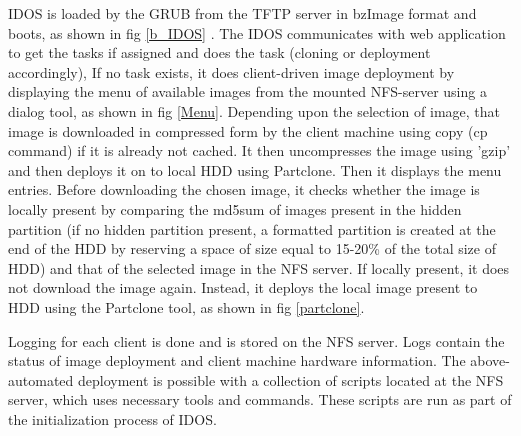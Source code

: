 \documentclass[a4paper,12pt]{article}
\begin{document}
IDOS is loaded by the GRUB from the TFTP server in bzImage format and boots, as shown in fig \ref{b_IDOS} . The IDOS communicates with web application to get the tasks if assigned and does the task (cloning or deployment accordingly), If no task exists, it does client-driven image deployment by displaying the menu of available images from the mounted NFS-server using a dialog tool, as shown in fig \ref{Menu}. Depending upon the selection of image, that image is downloaded in compressed form by the client machine using copy (cp command) if it is already not cached. It then uncompresses the image using 'gzip' and then deploys it on to local HDD using Partclone. Then it displays the menu entries. Before downloading the chosen image, it checks whether the image is locally present by comparing the md5sum of images present in the hidden partition (if no hidden partition present, a formatted partition is created at the end of the HDD by reserving a space of size equal to 15-20\% of the total size of HDD) and that of the selected image in the NFS server. If locally present, it does not download the image again. Instead, it deploys the local image present to HDD using the Partclone tool, as shown in fig \ref{partclone}.

Logging for each client is done and is stored on the NFS server. Logs contain the status of image deployment and client machine hardware information. The above-automated deployment is possible with a collection of scripts located at the NFS server, which uses necessary tools and commands. These scripts are run as part of the initialization process of IDOS.
\end{document}

